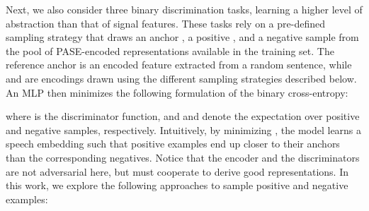\documentclass[a4paper]{article}
\begin{document}
Next, we also consider three binary discrimination tasks, learning a higher level of abstraction than that of signal features. These tasks rely on a pre-defined sampling strategy that draws an anchor , a positive , and a negative  sample from the pool of PASE-encoded representations available in the training set. The reference anchor  is an encoded feature extracted from a random sentence, while  and  are encodings drawn using the different sampling strategies described below. An MLP then minimizes the following formulation of the binary cross-entropy:

where  is the discriminator function, and  and  denote the expectation over positive and negative samples, respectively. Intuitively, by minimizing , the model learns a speech embedding such that positive examples end up closer to their anchors than the corresponding negatives. Notice that the encoder and the discriminators are not adversarial here, but must cooperate to derive good representations.
In this work, we explore the following approaches to sample positive and negative examples:
\end{document}
